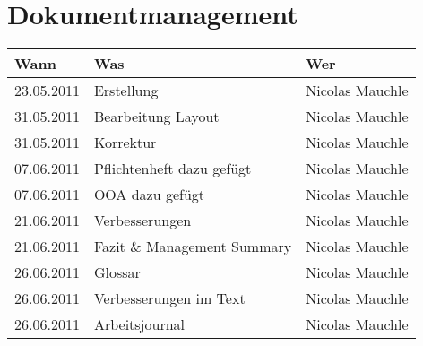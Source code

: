 \section*{Dokumentmanagement}
\begin{tabular}{lp{9cm}l}
  \toprule
  \textbf{Wann} & \textbf{Was} & \textbf{Wer}\\
  \midrule
  23.05.2011 & Erstellung & Nicolas Mauchle\\
  31.05.2011 & Bearbeitung Layout & Nicolas Mauchle\\
  31.05.2011 & Korrektur & Nicolas Mauchle\\
  07.06.2011 & Pflichtenheft dazu gefügt & Nicolas Mauchle\\
  07.06.2011 & OOA dazu gefügt & Nicolas Mauchle\\
  21.06.2011 & Verbesserungen & Nicolas Mauchle\\
  21.06.2011 & Fazit \& Management Summary & Nicolas Mauchle\\
  26.06.2011 & Glossar & Nicolas Mauchle\\
  26.06.2011 & Verbesserungen im Text & Nicolas Mauchle\\
  26.06.2011 & Arbeitsjournal & Nicolas Mauchle\\
  \bottomrule
\end{tabular}

\newpage
%
